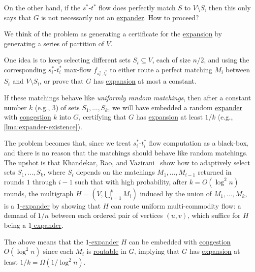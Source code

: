 On the other hand, if the \(s^{\ast} \)-\(t^{\ast} \) flow does perfectly match \(S\) to \(V\setminus S\), then this only says that \(G\) is not necessarily not an \hyperref[def:expander]{expander}. How to proceed?

\begin{intuition}
	We think of the problem as generating a certificate for the \hyperref[def:expansion]{expansion} by generating a series of partition of \(V\).
\end{intuition}

One idea is to keep selecting different sets \(S_i \subseteq V\), each of size \(n / 2\), and using the corresponding \(s^{\ast} _i\)-\(t^{\ast} _i\) max-flow \(f_{s^{\ast}_i , t^{\ast}_i }\) to either route a perfect matching \(M_i\) between \(S_i\) and \(V\setminus S_i\), or prove that \(G\) has \hyperref[def:expansion]{expansion} at most a constant.

\begin{intuition}
	If these matchings behave like \emph{uniformly random matchings}, then after a constant number \(k\) (e.g., \(3\)) of sets \(S_1, \dots , S_k\), we will have embedded a random \hyperref[def:expander]{expander} with \hyperref[def:congestion]{congestion} \(k\) into \(G\), certifying that \(G\) has \hyperref[def:expansion]{expansion} at least \(1 / k\) (e.g., \autoref{lma:expander-existence}).
\end{intuition}

The problem becomes that, since we treat \(s^{\ast}_i\)-\(t^{\ast} _i\) flow computation as a black-box, and there is no reason that the matchings should behave like random matchings. The upshot is that Khandekar, Rao, and Vazirani~\cite{khandekar2009graph} show how to adaptively select sets \(S_1, \dots , S_k\), where \(S_i\) depends on the matchings \(M_1, \dots , M_{i-1}\) returned in rounds \(1\) through \(i-1\) such that with high probability, after \(k = O(\log ^2 n)\) rounds, the multigraph \(H = (V, \bigcup_{i=1}^{k} M_i)\) induced by the union of \(M_1, \dots , M_k\), is a \hyperref[def:expander]{\(1\)-expander} by showing that \(H\) can route uniform multi-commodity flow: a demand of \(1 / n\) between each ordered pair of vertices \((u, v)\), which suffice for \(H\) being a \hyperref[def:expander]{\(1\)-expander}.

\begin{remark}
	The above means that the \hyperref[def:expander]{\(1\)-expander} \(H\) can be embedded with \hyperref[def:congestion]{congestion} \(O(\log ^2 n)\) since each \(M_i\) is \hyperref[def:routable]{routable} in \(G\), implying that \(G\) has \hyperref[def:expansion]{expansion} at least \(1 / k = \Omega (1 / \log ^2 n)\).
\end{remark}

